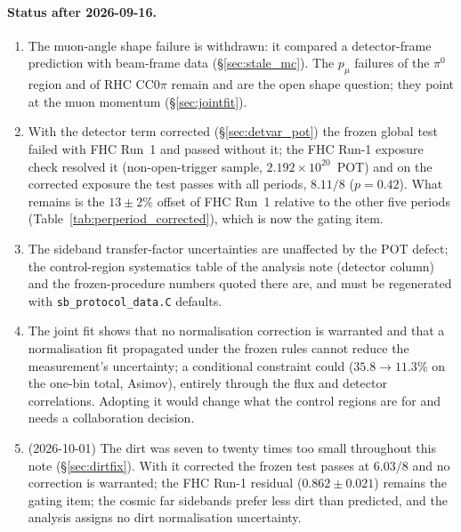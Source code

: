 \documentclass[11pt,a4paper]{article}
\begin{document}
\paragraph{Status after 2026-09-16.}
\begin{enumerate}[itemsep=3pt]
  \item The muon-angle shape failure is withdrawn: it compared a detector-frame prediction with beam-frame data
    (\S\ref{sec:stale_mc}). The $p_\mu$ failures of the $\pi^0$ region and of RHC CC$0\pi$ remain and are the open
    shape question; they point at the muon momentum (\S\ref{sec:jointfit}).
  \item With the detector term corrected (\S\ref{sec:detvar_pot}) the frozen global test failed with FHC Run~1 and
    passed without it; the FHC Run-1 exposure check resolved it (non-open-trigger sample, $2.192\times10^{20}$~POT)
    and on the corrected exposure the test passes with all periods, $8.11/8$ ($p=0.42$). What remains is the
    $13\pm2\%$ offset of FHC Run~1 relative to the other five periods (Table~\ref{tab:perperiod_corrected}),
    which is now the gating item.
  \item The sideband transfer-factor uncertainties are unaffected by the POT defect; the control-region
    systematics table of the analysis note (detector column) and the frozen-procedure numbers quoted there are, and
    must be regenerated with \texttt{sb\_protocol\_data.C} defaults.
  \item The joint fit shows that no normalisation correction is warranted and that a normalisation fit propagated
    under the frozen rules cannot reduce the measurement's uncertainty; a conditional constraint could ($35.8\to11.3\%$
    on the one-bin total, Asimov), entirely through the flux and detector correlations. Adopting it would change what
    the control regions are for and needs a collaboration decision.
  \item (2026-10-01) The dirt was seven to twenty times too small throughout this note (\S\ref{sec:dirtfix}). With
    it corrected the frozen test passes at $6.03/8$ and no correction is warranted; the FHC Run-1 residual
    ($0.862\pm0.021$) remains the gating item; the cosmic far sidebands prefer less dirt than predicted, and the
    analysis assigns no dirt normalisation uncertainty.
\end{enumerate}
\end{document}
